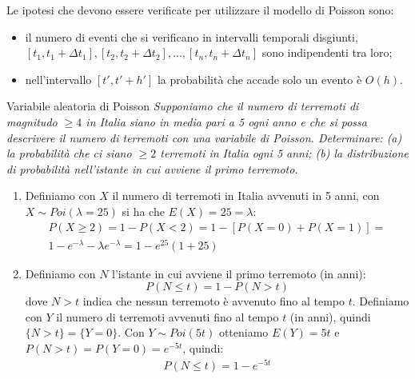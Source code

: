 Le ipotesi che devono essere verificate per utilizzare il modello di Poisson sono:
\begin{itemize}
    \item il numero di eventi che si verificano in intervalli temporali disgiunti, $[t_1,t_1+\Delta t_1],[t_2,t_2+\Delta t_2],...,[t_n,t_n+\Delta t_n]$ sono indipendenti tra loro;
    \item nell'intervallo $[t',t'+h']$ la probabilità che accade solo un evento è  $O(h)$.
\end{itemize}

\begin{Example}{Variabile aleatoria di Poisson}{}
    \textit{Supponiamo che il numero di terremoti di magnitudo $\geq4$ in Italia siano in media pari a 5 ogni anno e che si possa descrivere il numero di terremoti con una variabile di Poisson. Determinare: (a) la probabilità che ci siano $\geq2$ terremoti in Italia ogni 5 anni; (b) la distribuzione di probabilità nell'istante in cui avviene il primo terremoto.}

    \begin{enumerate}[label=(\alph*)]
        \item Definiamo con $X$ il numero di terremoti in Italia avvenuti in 5 anni, con $X\sim Poi(\lambda=25)$ si ha che $E(X)=25=\lambda$:
        \begin{align*}
            P(X\geq 2)=1-P(X<2)=1-[P(X=0)+P(X=1)]=\\1-e^{-\lambda}-\lambda e^{-\lambda}=1-e^{25}(1+25)
        \end{align*}
        
        \item Definiamo con $N$ l'istante in cui avviene il primo terremoto (in anni):
        \begin{equation*}
            P(N\leq t)=1-P(N>t)
        \end{equation*}
        dove $N>t$ indica che nessun terremoto è avvenuto fino al tempo $t$. Definiamo con $Y$ il numero di terremoti avvenuti fino al tempo $t$ (in anni), quindi $\{N>t\}=\{Y=0\}$. Con $Y\sim Poi(5t)$ otteniamo $E(Y)=5t$ e $P(N>t)=P(Y=0)=e^{-5t}$, quindi:
        \begin{align*}
            P(N\leq t)=1-e^{-5t}
        \end{align*}
    \end{enumerate}
\end{Example}


